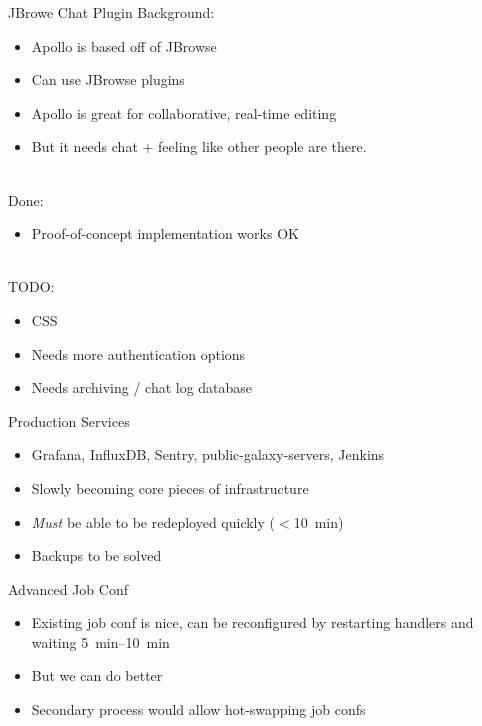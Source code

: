 \documentclass[12pt]{ufrslides}
\begin{document}
	\begin{frame}{JBrowe Chat Plugin}
		Background:
		\begin{itemize}
			\item Apollo is based off of JBrowse
			\item Can use JBrowse plugins
			\item Apollo is great for collaborative, real-time editing
			\item But it needs chat + feeling like other people are there.
		\end{itemize}
		\ \\[0.5cm]
		Done:
		\begin{itemize}
			\item Proof-of-concept implementation works OK
		\end{itemize}
		\ \\[0.5cm]
		TODO:
		\begin{itemize}
			\item CSS
			\item Needs more authentication options
			\item Needs archiving / chat log database
		\end{itemize}
	\end{frame}

	\begin{frame}{Production Services}
		\begin{itemize}
			\item Grafana, InfluxDB, Sentry, public-galaxy-servers, Jenkins
			\item Slowly becoming core pieces of infrastructure
			\item \emph{Must} be able to be redeployed quickly ($<$\SI{10}{\minute})
			\item Backups to be solved
		\end{itemize}
	\end{frame}

	\begin{frame}{Advanced Job Conf}
		\begin{itemize}
			\item Existing job conf is nice, can be reconfigured by restarting handlers and waiting \SIrange{5}{10}{\minute}
			\item But we can do better
			\item Secondary process would allow hot-swapping job confs
		\end{itemize}
	\end{frame}
\end{document}
